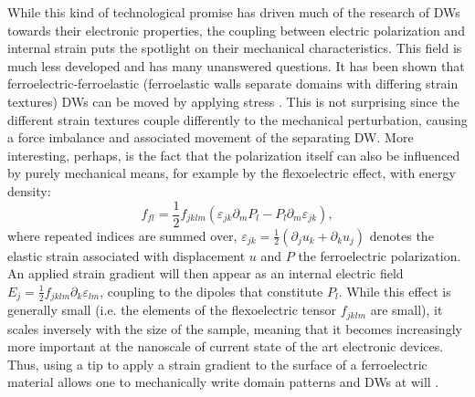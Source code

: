 While this kind of technological promise has driven much of the research of DWs towards their electronic properties, the coupling between electric polarization and internal strain puts the spotlight on their mechanical characteristics.
This field is much less developed and has many unanswered questions.
It has been shown that ferroelectric-ferroelastic (ferroelastic walls separate domains with differing strain textures) DWs can be moved by applying stress \cite{Schneider2001}.
This is not surprising since the different strain textures couple differently to the mechanical perturbation, causing a force imbalance and associated movement of the separating DW.
More interesting, perhaps, is the fact that the polarization itself can also be influenced by purely mechanical means, for example by the flexoelectric effect, with energy density:
\begin{equation}
	f_{fl} = \frac{1}{2}f_{jklm}(\varepsilon_{jk}\partial_mP_l-P_l\partial_m\varepsilon_{jk}),
\end{equation}
where repeated indices are summed over, $\varepsilon_{jk} = \frac{1}{2}(\partial_j u_k + \partial_k u_j)$ denotes the elastic strain associated with displacement $u$ and $P$ the ferroelectric polarization.
An applied strain gradient will then appear as an internal electric field $E_{j} = \frac{1}{2}f_{jklm}\partial_k\varepsilon_{lm}$, coupling to the dipoles that constitute $P_l$.
While this effect is generally small (i.e. the elements of the flexoelectric tensor $f_{jklm}$ are small), it scales inversely with the size of the sample, meaning that it becomes increasingly more important at the nanoscale of current state of the art electronic devices.
Thus, using a tip to apply a strain gradient to the surface of a ferroelectric material allows one to mechanically write domain patterns and DWs at will \cite{Lu2012}.

